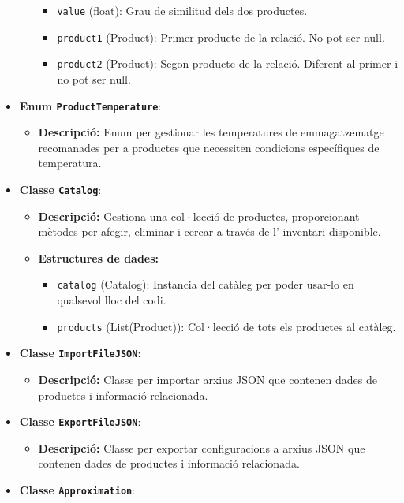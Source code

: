 \documentclass[a4paper,12pt]{report}
\begin{document}
\begin{itemize}
\begin{itemize}
			\begin{itemize}
				\item \texttt{value} (float): Grau de similitud dels dos productes.
				\item \texttt{product1} (Product): Primer producte de la relació. No pot ser null.
				\item \texttt{product2} (Product): Segon producte de la relació. Diferent al primer i no pot ser null.
			\end{itemize}
		\end{itemize}
		\item \textbf{Enum \texttt{ProductTemperature}}:
		\begin{itemize}
			\item \textbf{Descripció:} Enum per gestionar les temperatures de emmagatzematge recomanades per a productes que necessiten condicions específiques de temperatura.
		\end{itemize}
		\item \textbf{Classe \texttt{Catalog}}:
		\begin{itemize}
			\item \textbf{Descripció:} Gestiona una col·lecció de productes, proporcionant mètodes per afegir, eliminar i cercar a través de l' inventari disponible.
			\item \textbf{Estructures de dades:}
			\begin{itemize}
				\item \texttt{catalog} (Catalog): Instancia del catàleg per poder usar-lo en qualsevol lloc del codi.
				\item \texttt{products} (List(Product)): Col·lecció de tots els productes al catàleg.
			\end{itemize}
		\end{itemize}
		\item \textbf{Classe \texttt{ImportFileJSON}}:
		\begin{itemize}
			\item \textbf{Descripció:} Classe per importar arxius JSON que contenen dades de productes i informació relacionada.
		\end{itemize}
		\item \textbf{Classe \texttt{ExportFileJSON}}:
		\begin{itemize}
			\item \textbf{Descripció:} Classe per exportar configuracions a arxius JSON que contenen dades de productes i informació relacionada.
		\end{itemize}
		\item \textbf{Classe \texttt{Approximation}}:

\end{itemize}
\end{document}
